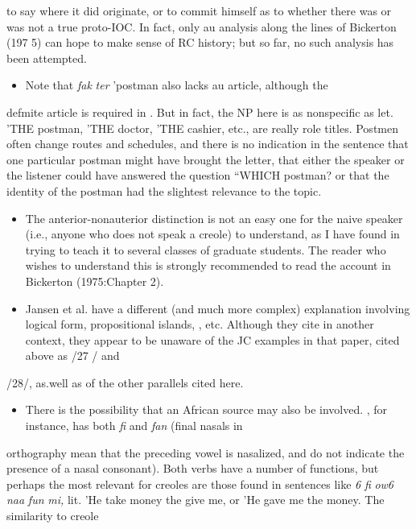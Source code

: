 \begin{itemize}
\begin{itemize}
\begin{itemize}
\begin{itemize}

to say where it did originate, or to commit himself as to whether there was or was not a true proto-IOC. In fact, only au analysis along the lines of Bickerton (197 5) can hope to make sense of RC history; but so far, no such analysis has been attempted.

\begin{itemize}
\item Note that \textit{fak} \textit{ter} 'postman also lacks au article, although the
\end{itemize}

defmite article is required in . But in fact, the NP here is as nonspecific as let. 'THE postman, 'THE doctor, 'THE cashier, etc., are really role titles. Postmen often change routes and schedules, and there is no indication in the sentence that one particular postman might have brought the letter, that either the speaker or the listener could have answered the question ``WHICH postman? or that the identity of the postman had the slightest relevance to the topic.

\begin{itemize}
\item The anterior-nonauterior distinction is not an easy one for the naive speaker (i.e., anyone who does not speak a creole) to under\-stand, as I have found in trying to teach it to several classes of graduate students. The reader who wishes to understand this is strongly recom\-mended to read the account in Bickerton (1975:Chapter 2).
\item Jansen et al. have a different (and much more complex) explanation involving logical form, propositional islands, , etc. Although they cite \citet{Roberts1975} in another context, they appear to be unaware of the JC examples in that paper, cited above as /27 / and
\end{itemize}

/28/, as.well as of the other parallels cited here.

\begin{itemize}
\item There is the possibility that an African source may also be involved. , for instance, has both \textit{fi} and \textit{fan }(final nasals in
\end{itemize}

 orthography mean that the preceding vowel is nasalized, and do not indicate the presence of a nasal consonant). Both verbs have a number of functions, but perhaps the most relevant for creoles are those found in sentences like \textit{6} \textit{fi} \textit{ow6 naa} \textit{fun} \textit{mi,} lit. 'He take money the give me, or 'He gave me the money. The similarity to creole


\end{itemize}
\end{itemize}
\end{itemize}
\end{itemize}
